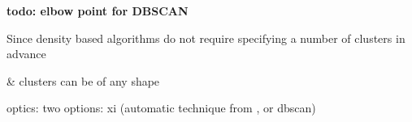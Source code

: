

\textbf{todo: elbow point for DBSCAN}

Since density based algorithms do not require specifying a number of clusters in advance

\& clusters can be of any shape

optics: two options: xi (automatic technique from \textcite{OPTICS}, or dbscan)